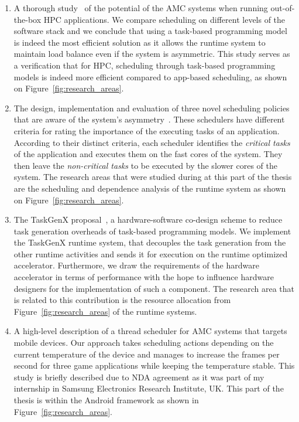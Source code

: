 \begin{enumerate}
	\item A thorough study~\cite{PACT_poster} of the potential of the AMC systems when running out-of-the-box HPC applications.
	We compare scheduling on different levels of the software stack and we conclude that using a task-based programming model is indeed the most efficient solution as it allows the runtime system to maintain load balance even if the system is asymmetric.
	This study serves as a verification that for HPC, scheduling through task-based programming models is indeed more efficient compared to app-based scheduling, as shown on Figure~\ref{fig:research_areas}.
	\item The design, implementation and evaluation of three novel scheduling policies that are aware of the system's asymmetry~\cite{Chronaki:ICS2015,Chronaki:TPDS}.
	These schedulers have different criteria for rating the importance of the executing tasks of an application.
	According to their distinct criteria, each scheduler identifies the \textit{critical tasks} of the application and executes them on the fast cores of the system. 
	They then leave the \textit{non-critical tasks} to be executed by the slower cores of the system.
	The research areas that were studied during at this part of the thesis are the scheduling and dependence analysis of the runtime system as shown on Figure~\ref{fig:research_areas}.
	\item The TaskGenX proposal~\cite{Chronaki:ISC}, a hardware-software co-design scheme to reduce task generation overheads of task-based programming models.
	We implement the TaskGenX runtime system, that decouples the task generation from the other runtime activities and sends it for execution on the runtime optimized accelerator.
	Furthermore, we draw the requirements of the hardware accelerator in terms of performance with the hope to influence hardware designers for the implementation of such a component.
	The research area that is related to this contribution is the resource allocation from Figure~\ref{fig:research_areas} of the runtime systems.
	\item A high-level description of a thread scheduler for AMC systems that targets mobile devices.
	Our approach takes scheduling actions depending on the current temperature of the device and manages to increase the frames per second for three game applications while keeping the temperature stable.
	This study is briefly described due to NDA agreement as it was part of my internship in Samsung Electronics Research Institute, UK.
	This part of the thesis is within the Android framework as shown in Figure~\ref{fig:research_areas}.
\end{enumerate}


